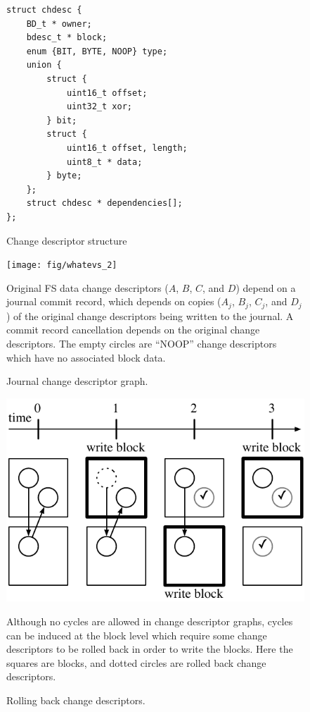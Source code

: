 \begin{figure}
\begin{verbatim}
struct chdesc {
    BD_t * owner;
    bdesc_t * block;
    enum {BIT, BYTE, NOOP} type;
    union {
        struct {
            uint16_t offset;
            uint32_t xor;
        } bit;
        struct {
            uint16_t offset, length;
            uint8_t * data;
        } byte;
    };
    struct chdesc * dependencies[];
};
\end{verbatim}
\caption{\label{fig:chdesc} Change descriptor structure}
\end{figure}

\begin{figure}
  \centering
  \texttt{[image: fig/whatevs\_2]}
  \caption{\label{fig:journal} Journal change descriptor graph.}{Original FS
  data change descriptors ($A$, $B$, $C$, and $D$) depend on a journal commit
  record, which depends on copies ($A_j$, $B_j$, $C_j$, and $D_j$) of the
  original change descriptors being written to the journal. A commit record
  cancellation depends on the original change descriptors. The empty circles are
  ``NOOP'' change descriptors which have no associated block data.}
\end{figure}

\begin{figure}
  \centering
  \includegraphics[width=\columnwidth]{rollback_sequence}
  \caption{\label{fig:rollback} Rolling back change descriptors.}{Although no
  cycles are allowed in change descriptor graphs, cycles can be induced at the
  block level which require some change descriptors to be rolled back in order
  to write the blocks. Here the squares are blocks, and dotted circles are
  rolled back change descriptors.}
\end{figure}
